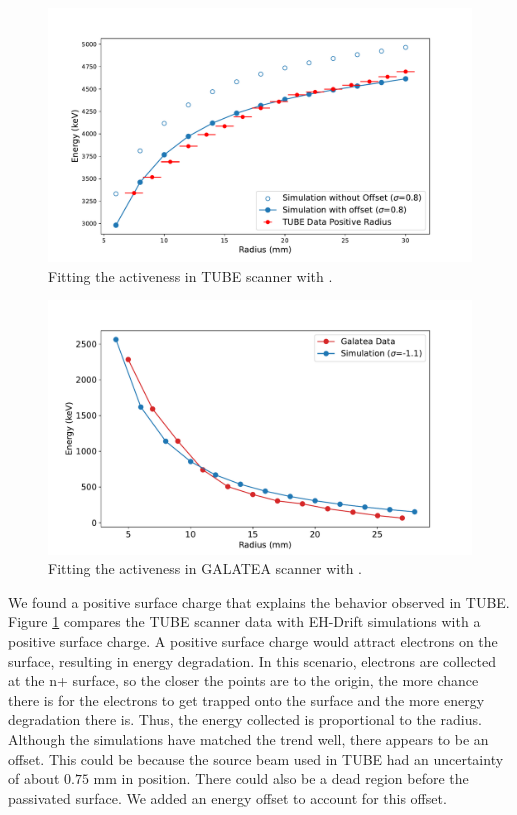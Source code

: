 \begin{figure}%
\includegraphics[trim={0.3cm 0.1cm 1.7cm 0.1cm},clip,width=\linewidth]{ch5/figs/tube_fit.pdf}
\caption{Fitting the activeness in TUBE scanner with \ehd{}.}
\label{fig:tube_fit}
\end{figure}


\begin{figure}%
\includegraphics[trim={0.3cm 0.1cm 1.7cm 1cm},clip,width=\linewidth]{ch5/figs/gal_fit.pdf}
\caption{Fitting the activeness in GALATEA scanner with \ehd{}.}
\label{fig:gal_fit}
\end{figure}

We found a positive surface charge that explains the behavior observed in TUBE. Figure \ref{fig:tube_fit} compares the TUBE scanner data with EH-Drift simulations with a positive surface charge. A positive surface charge would attract electrons on the surface, resulting in energy degradation. In this scenario, electrons are collected at the n+ surface, so the closer the points are to the origin, the more chance there is for the electrons to get trapped onto the surface and the more energy degradation there is. Thus, the energy collected is proportional to the radius. Although the simulations have matched the trend well, there appears to be an offset. This could be because the source beam used in TUBE had an uncertainty of about $0.75$ mm in position. There could also be a dead region before the passivated surface. We added an energy offset to account for this offset.

